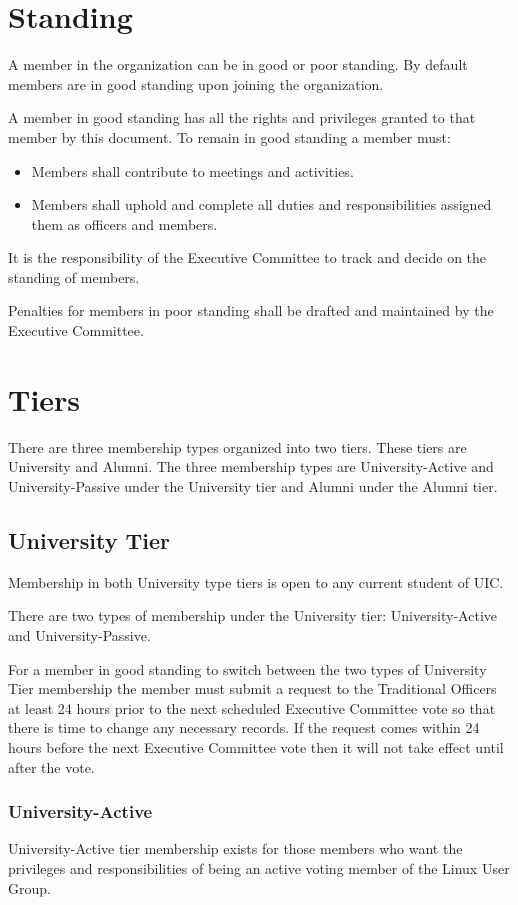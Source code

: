 \documentclass[letter]{report}
\begin{document}
\section{Standing}
A member in the organization can be in good or poor standing. By default members
are in good standing upon joining the organization.

A member in good standing has all the rights and privileges granted to that
member by this document. To remain in good standing a member must:
\begin{itemize}
\item Members shall contribute to meetings and activities.
\item Members shall uphold and complete all duties and responsibilities
	assigned them as officers and members.
\end{itemize}
It is the responsibility of the Executive Committee to track and decide on the
standing of members.

Penalties for members in poor standing shall be drafted and
maintained by the Executive Committee.

\section{Tiers}
There are three membership types organized into two tiers. These tiers are
University and Alumni. The three membership types are University-Active and
University-Passive under the University tier and Alumni under the Alumni tier.

\subsection{University Tier}
Membership in both University type tiers is open to any current student of UIC.

There are two types of membership under the University tier: University-Active
and University-Passive.

For a member in good standing to switch between the two types of University Tier
membership the member must submit a request to the Traditional Officers at least
24 hours prior to the next scheduled Executive Committee vote so that there is
time to change any necessary records. If the request comes within 24 hours
before the next Executive Committee vote then it will not take effect until
after the vote.

\subsubsection{University-Active}
University-Active tier membership exists for those members who want the
privileges and responsibilities of being an active voting member of the Linux
User Group.
\end{document}
